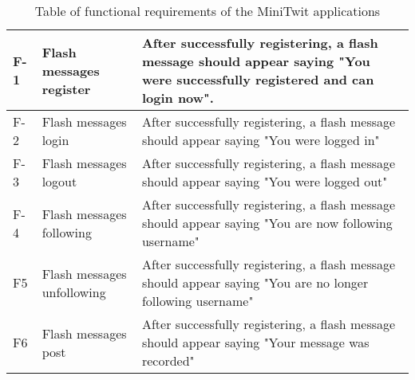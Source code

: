 \documentclass[main.tex]{subfiles}
\begin{document}
\begin{table*}[h]
\begin{tabular}{|m{1cm}|m{3cm}|m{12cm}|}

        \hline
        F-1& Flash messages register& After successfully  registering, a flash message should appear saying "You were successfully registered and can login now".\\
        \hline
 F-2& Flash messages login&After successfully  registering, a flash message should appear saying "You were logged in"\\\hline
 F-3& Flash messages logout&After successfully  registering, a flash message should appear saying "You were logged out"\\\hline
 F-4& Flash messages following&After successfully  registering, a flash message should appear saying "You are now following username"\\\hline
 F5& Flash messages unfollowing&After successfully  registering, a flash message should appear saying "You are no longer following username"\\\hline
 F6& Flash messages post&After successfully  registering, a flash message should appear saying "Your message was recorded"\\\hline
    \end{tabular}
    \caption{Table of functional requirements of the MiniTwit applications}
    \label{tab:my_label}
\end{table*}
\end{document}
